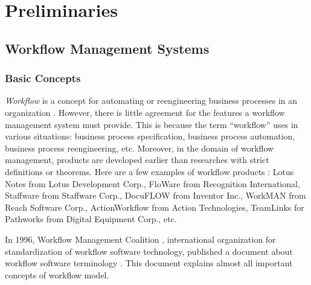 
\chapter{Preliminaries}
\label{chap:preliminaries}

\section{Workflow Management Systems}
\label{sec:pre:wfms}

\subsection{Basic Concepts}

\emph{Workflow} is a concept for automating or reengineering business
processes in an organization \cite{abbott:cscw94, georgakopoulos:jdps95,%
schal:book96}.  However, there is little agreement for the features a
workflow management system must provide.  This is because the term
``workflow'' uses in various situations: business process specification,
business process automation, business process reengineering, etc.
Moreover, in the domain of workflow management, products are developed
earlier than researches with strict definitions or theorems.  Here are a
few examples of workflow products \cite{georgakopoulos:jdps95}: Lotus
Notes from Lotus Development Corp., FloWare from Recognition
International, Staffware from Staffware Corp., DocuFLOW from Inventor
Inc., WorkMAN from Reach Software Corp., ActionWorkflow from Action
Technologies, TeamLinks for Pathworks from Digital Equipment Corp., etc.

In 1996, Workflow Management Coalition \cite{wfCoalition}, international
organization for standardization of workflow software technology,
published a document about workflow software terminology
\cite{96:wfCoalitionTC1011}.  This document explains almost all
important concepts of workflow model.

